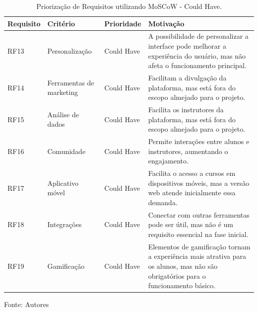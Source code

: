 \begin{apendicesenv}
\begin{table}[h]
    \centering
    \caption{Priorização de Requisitos utilizando MoSCoW - Could Have.}
    \label{tab:priorizacao_moscow3}
    \begin{adjustbox}{width=\textwidth}
        \begin{tabular}{|p{2.5cm}|p{5cm}|p{5cm}|p{4cm}|}
            \hline
            \textbf{Requisito} & \textbf{Critério} & \textbf{Prioridade} & \textbf{Motivação} \\
            \hline
            RF13 & Personalização & Could Have & A possibilidade de personalizar a interface pode melhorar a experiência do usuário, mas não afeta o funcionamento principal. \\
            \hline
            RF14 & Ferramentas de marketing & Could Have & Facilitam a divulgação da plataforma, mas está fora do escopo almejado para o projeto. \\
            \hline
            RF15 & Análise de dados & Could Have & Facilita os instrutores da plataforma, mas está fora do escopo almejado para o projeto. \\
            \hline
            RF16 & Comunidade & Could Have & Permite interações entre alunos e instrutores, aumentando o engajamento. \\
            \hline
            RF17 & Aplicativo móvel & Could Have & Facilita o acesso a cursos em dispositivos móveis, mas a versão web atende inicialmente essa demanda. \\
            \hline
            RF18 & Integrações & Could Have & Conectar com outras ferramentas pode ser útil, mas não é um requisito essencial na fase inicial. \\
            \hline
            RF19 & Gamificação & Could Have & Elementos de gamificação tornam a experiência mais atrativa para os alunos, mas não são obrigatórios para o funcionamento básico. \\
            \hline
        \end{tabular}
    \end{adjustbox}
    \vspace{5mm}
    {\footnotesize Fonte: Autores} 
\end{table}



\end{apendicesenv}
